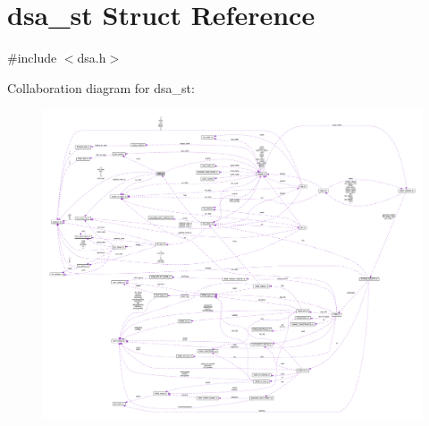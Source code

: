 \hypertarget{structdsa__st}{}\section{dsa\+\_\+st Struct Reference}
\label{structdsa__st}


{\ttfamily \#include $<$dsa.\+h$>$}



Collaboration diagram for dsa\+\_\+st\+:\nopagebreak
\begin{figure}[H]
\begin{center}
\leavevmode
\includegraphics[width=350pt]{structdsa__st__coll__graph}
\end{center}
\end{figure}
